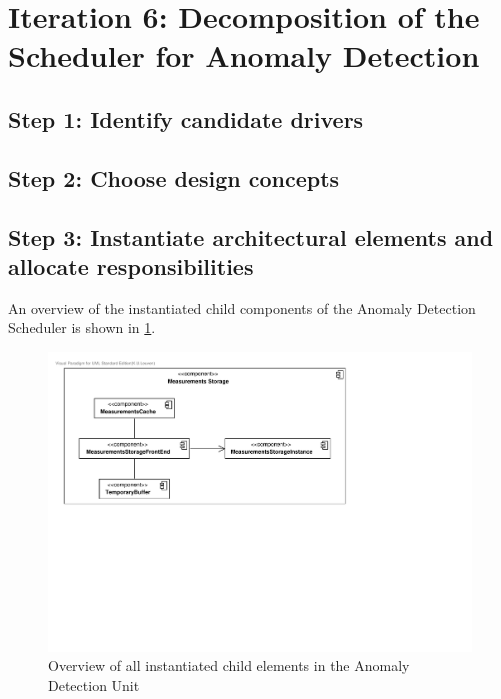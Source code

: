 \section{Iteration 6: Decomposition of the Scheduler for Anomaly Detection}
\label{add:it6}

\subsection{Step 1: Identify candidate drivers}
\label{add:it6/drivers}


\subsection{Step 2: Choose design concepts}
\label{add:it6/concepts}


\subsection{Step 3: Instantiate architectural elements and allocate responsibilities}
\label{add:it6/elements}


\npar An overview of the instantiated child components of the Anomaly Detection
Scheduler is shown in \ref{fig:it6/elements}.

\begin{figure}[H]
	\begin{centering}
		\includegraphics[width=\textwidth]{figs/add-it4-elements.pdf}
		\caption{Overview of all instantiated child elements in the Anomaly
		Detection Unit}
		\label{fig:it6/elements}
	\end{centering}
\end{figure}

